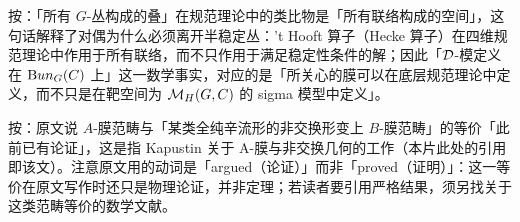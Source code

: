 \begin{yizhu}[物理图像]
按：「所有 $G$-丛构成的叠」在规范理论中的类比物是「所有联络构成的空间」，这句话解释了对偶为什么必须离开半稳定丛：'t Hooft 算子（Hecke 算子）在四维规范理论中作用于所有联络，而不只作用于满足稳定性条件的解；因此「${\cal D}$-模定义在 ${\rm Bun}_G(C)$ 上」这一数学事实，对应的是「所关心的膜可以在底层规范理论中定义，而不只是在靶空间为 $\MH(G,C)$ 的 sigma 模型中定义」。
\end{yizhu}

\begin{yizhu}[含糊点拨]
按：原文说 $A$-膜范畴与「某类全纯辛流形的非交换形变上 $B$-膜范畴」的等价「此前已有论证」，这是指 Kapustin 关于 A-膜与非交换几何的工作（本片此处的引用即该文）。注意原文用的动词是「argued（论证）」而非「proved（证明）」：这一等价在原文写作时还只是物理论证，并非定理；若读者要引用严格结果，须另找关于这类范畴等价的数学文献。
\end{yizhu}
